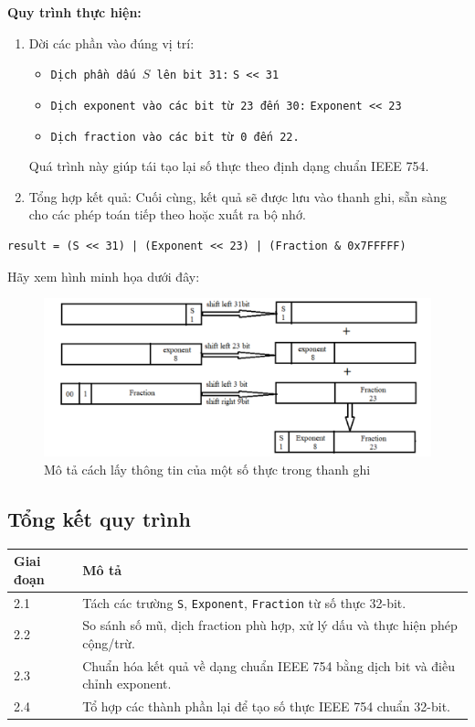 \textbf{Quy trình thực hiện:}
\begin{enumerate}
    \item Dời các phần vào đúng vị trí:
    \begin{itemize}
        \item \texttt{Dịch phần dấu \( S \) lên bit 31:} \texttt{S << 31}
        \item \texttt{Dịch exponent vào các bit từ 23 đến 30:} \texttt{Exponent << 23}
        \item \texttt{Dịch fraction vào các bit từ 0 đến 22.} 
    \end{itemize}
     Quá trình này giúp tái tạo lại số thực theo định dạng chuẩn IEEE 754.
    \item Tổng hợp kết quả:
       Cuối cùng, kết quả sẽ được lưu vào thanh ghi, sẵn sàng cho các phép toán tiếp theo hoặc xuất ra bộ nhớ.
\end{enumerate}
\begin{lstlisting}
result = (S << 31) | (Exponent << 23) | (Fraction & 0x7FFFFF)
\end{lstlisting}
Hãy xem hình minh họa dưới đây:
\begin{figure}[!h]
    \centering 
    \includegraphics[width=1\textwidth]{image/Tổ Hợp Kết Quả.png}
         \vspace{0.5cm}
    \caption{Mô tả cách lấy thông tin của một số thực trong thanh ghi}
\end{figure}
\vspace{0.5em}
\subsection*{Tổng kết quy trình}
\begin{center}
\begin{tabular}{|l|p{10cm}|}
\hline
\textbf{Giai đoạn} & \textbf{Mô tả} \\
\hline
2.1 & Tách các trường \texttt{S}, \texttt{Exponent}, \texttt{Fraction} từ số thực 32-bit. \\
\hline
2.2 & So sánh số mũ, dịch fraction phù hợp, xử lý dấu và thực hiện phép cộng/trừ. \\
\hline
2.3 & Chuẩn hóa kết quả về dạng chuẩn IEEE 754 bằng dịch bit và điều chỉnh exponent. \\
\hline
2.4 & Tổ hợp các thành phần lại để tạo số thực IEEE 754 chuẩn 32-bit. \\
\hline
\end{tabular}
\end{center}


